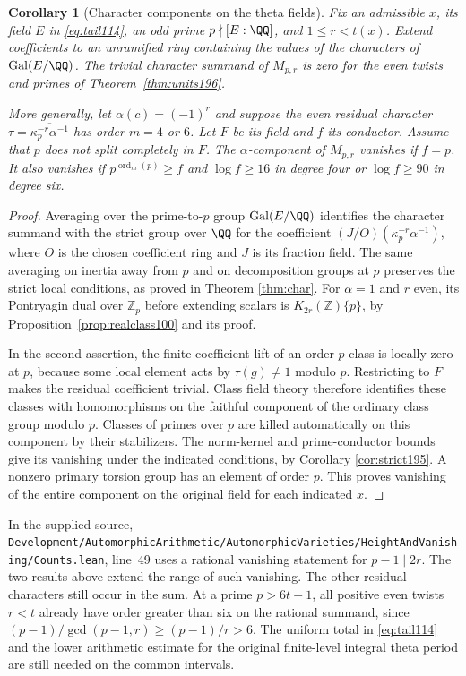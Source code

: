 \documentclass[a4paper,11pt]{article}
\newtheorem{corollary}[proposition]{Corollary}
\theoremstyle{definition}
\theoremstyle{remark}
\newcommand{\ZZ}{\mathbb Z}\newcommand{\ord}{\operatorname{ord}}
\newcommand{\srcloc}[2]{{\small\nolinkurl{#1.lean}}, line~#2}
\numberwithin{equation}{section}
\begin{document}
\begin{corollary}[Character components on the theta fields]\label{cor:units196}
Fix an admissible \(x\), its field \(E\) in \eqref{eq:tail114},
an odd prime \(p\nmid[E:\QQ]\), and \(1\le r<t(x)\). Extend
coefficients to an unramified ring containing the values of
the characters of \(\operatorname{Gal}(E/\QQ)\). The trivial
character summand of \(M_{p,r}\) is zero for the even twists
and primes of Theorem~\ref{thm:units196}.

More generally, let \(\alpha(c)=(-1)^r\) and suppose the even
residual character \(\tau=\overline{\kappa_p^{-r}\alpha^{-1}}\)
has order \(m=4\) or \(6\). Let \(F\) be its field and \(f\) its
conductor. Assume that \(p\) does not split completely in \(F\).
The \(\alpha\)-component of \(M_{p,r}\) vanishes if \(f=p\). It
also vanishes if \(p^{\operatorname{ord}_m(p)}\ge f\) and
\(\log f\ge16\) in degree four or \(\log f\ge90\) in degree six.
\end{corollary}
\begin{proof}
Averaging over the prime-to-\(p\) group
\(\operatorname{Gal}(E/\QQ)\) identifies the character summand
with the strict group over \(\QQ\) for the coefficient
\((J/O)(\kappa_p^{-r}\alpha^{-1})\), where \(O\) is the chosen
coefficient ring and \(J\) is its fraction field. The same
averaging on inertia away from \(p\) and on decomposition groups
at \(p\) preserves the strict local conditions, as proved in
Theorem \ref{thm:char}.
For \(\alpha=1\) and \(r\) even, its Pontryagin dual over
\(\ZZ_p\) before extending scalars is \(K_{2r}(\ZZ)\{p\}\),
by Proposition~\ref{prop:realclass100} and its proof.

In the second assertion, the finite coefficient lift of an
order-\(p\) class is locally zero at \(p\), because some local
element acts by \(\tau(g)\ne1\) modulo \(p\). Restricting to
\(F\) makes the residual coefficient trivial. Class field theory
therefore identifies these classes with homomorphisms on the
faithful component of the ordinary class group modulo \(p\).
Classes of primes over \(p\) are killed automatically on this
component by their stabilizers. The norm-kernel and prime-conductor
bounds give its vanishing under the indicated conditions, by
Corollary \ref{cor:strict195}.
A nonzero primary torsion group has an element of order \(p\).
This proves vanishing of the entire component on the original
field for each indicated \(x\).
\end{proof}

In the supplied source,
\srcloc{Development/AutomorphicArithmetic/AutomorphicVarieties/HeightAndVanishing/Counts}{49}
uses a rational vanishing statement for \(p-1\mid2r\).
The two results above extend the range of such vanishing.
The other residual characters still occur in the sum. At a prime \(p>6t+1\), all positive even twists
\(r<t\) already have order greater than six on the rational
summand, since \((p-1)/\gcd(p-1,r)\ge(p-1)/r>6\).
The uniform total in \eqref{eq:tail114} and the lower arithmetic
estimate for the original finite-level integral theta period
are still needed on the common intervals.
\end{document}
